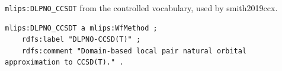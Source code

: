 \texttt{mlips:DLPNO\_CCSDT} from the controlled vocabulary, used by smith2019ccx.
\begin{lstlisting}[language=turtle]
mlips:DLPNO_CCSDT a mlips:WfMethod ;
    rdfs:label "DLPNO-CCSD(T)" ;
    rdfs:comment "Domain-based local pair natural orbital approximation to CCSD(T)." .
\end{lstlisting}
